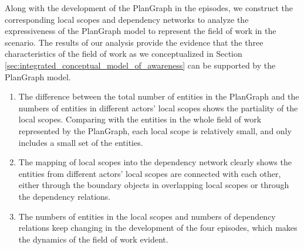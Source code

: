 Along with the development of the PlanGraph in the episodes, we construct the corresponding local scopes and dependency networks to analyze the expressiveness of the PlanGraph model to represent the field of work in the scenario. The results of our analysis provide the evidence that the three characteristics of the field of work as we conceptualized in Section \ref{sec:integrated_conceptual_model_of_awareness} can be supported by the PlanGraph model.

\begin{enumerate}
	\item The difference between the total number of entities in the PlanGraph and the numbers of entities in different actors' local scopes shows the partiality of the local scopes. Comparing with the entities in the whole field of work represented by the PlanGraph, each local scope is relatively small, and only includes a small set of the entities.
	\item The mapping of local scopes into the dependency network clearly shows the entities from different actors' local scopes are connected with each other, either through the boundary objects in overlapping local scopes or through the dependency relations.
	\item The numbers of entities in the local scopes and numbers of dependency relations keep changing in the development of the four episodes, which makes the dynamics of the field of work evident. 
\end{enumerate}

